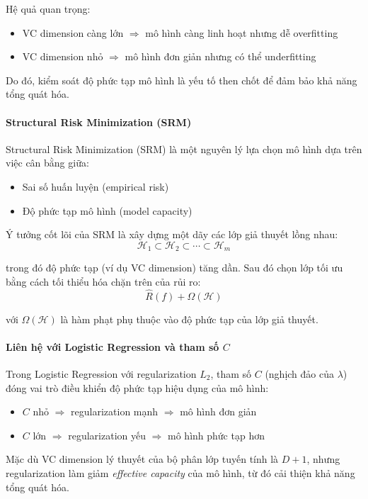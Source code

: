 Hệ quả quan trọng:
\begin{itemize}
    \item VC dimension càng lớn $\Rightarrow$ mô hình càng linh hoạt nhưng dễ overfitting
    \item VC dimension nhỏ $\Rightarrow$ mô hình đơn giản nhưng có thể underfitting
\end{itemize}

Do đó, kiểm soát độ phức tạp mô hình là yếu tố then chốt để đảm bảo khả năng tổng quát hóa.

\paragraph{Structural Risk Minimization (SRM)}

Structural Risk Minimization (SRM) là một nguyên lý lựa chọn mô hình dựa trên việc cân bằng giữa:
\begin{itemize}
    \item Sai số huấn luyện (empirical risk)
    \item Độ phức tạp mô hình (model capacity)
\end{itemize}

Ý tưởng cốt lõi của SRM là xây dựng một dãy các lớp giả thuyết lồng nhau:
\[
\mathcal{H}_1 \subset \mathcal{H}_2 \subset \cdots \subset \mathcal{H}_m
\]

trong đó độ phức tạp (ví dụ VC dimension) tăng dần. Sau đó chọn lớp tối ưu bằng cách tối thiểu hóa chặn trên của rủi ro:
\[
\hat{R}(f) + \Omega(\mathcal{H})
\]

với $\Omega(\mathcal{H})$ là hàm phạt phụ thuộc vào độ phức tạp của lớp giả thuyết.

\paragraph{Liên hệ với Logistic Regression và tham số $C$}

Trong Logistic Regression với regularization $L_2$, tham số $C$ (nghịch đảo của $\lambda$) đóng vai trò điều khiển độ phức tạp hiệu dụng của mô hình:
\begin{itemize}
    \item $C$ nhỏ $\Rightarrow$ regularization mạnh $\Rightarrow$ mô hình đơn giản
    \item $C$ lớn $\Rightarrow$ regularization yếu $\Rightarrow$ mô hình phức tạp hơn
\end{itemize}

Mặc dù VC dimension lý thuyết của bộ phân lớp tuyến tính là $D+1$, nhưng regularization làm giảm \textit{effective capacity} của mô hình, từ đó cải thiện khả năng tổng quát hóa.

